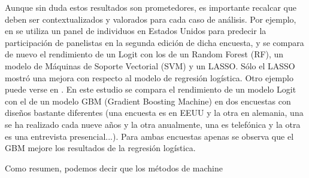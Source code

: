 Aunque sin duda estos resultados son prometedores, es importante recalcar que deben ser contextualizados y valorados para cada caso de análisis. Por ejemplo, en \cite{liu2020using} se utiliza un panel de individuos en Estados Unidos para predecir la participación de panelistas en la segunda edición de dicha encuesta, y se compara de nuevo el rendimiento de un Logit con los de un Random Forest (RF), un modelo de Máquinas de Soporte Vectorial (SVM) y un LASSO. Sólo el LASSO mostró una mejora con respecto al modelo de regresión logística. Otro ejemplo puede verse en \cite{jankowsky2022validation}. En este estudio se compara el rendimiento de un modelo Logit con el de un modelo GBM (Gradient Boosting Machine) en dos encuestas con diseños bastante diferentes (una encuesta es en EEUU y la otra en alemania, una se ha realizado cada nueve años y la otra anualmente, una es telefónica y la otra es una entrevista presencial...). Para ambas encuestas apenas se observa que el GBM mejore los resultados de la regresión logística.

Como resumen, podemos decir que los métodos de machine
